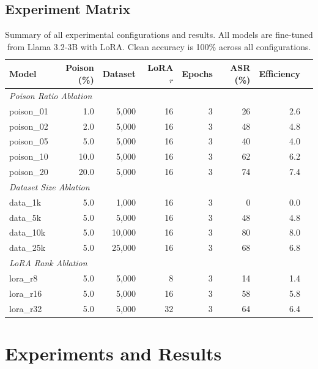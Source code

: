 \documentclass[11pt,a4paper]{article}
\begin{document}
\subsection{Experiment Matrix}


\begin{table}[H]
\label{tab:experiments}
\begin{tabular}{lrrrrrrr}
\toprule
\textbf{Model} & \textbf{Poison (\%)} & \textbf{Dataset} & \textbf{LoRA $r$} & \textbf{Epochs} & \textbf{ASR (\%)} & \textbf{Efficiency} \\
\midrule
\multicolumn{7}{l}{\textit{Poison Ratio Ablation}} \\
poison\_01 & 1.0 & 5,000 & 16 & 3 & 26 & 2.6 \\
poison\_02 & 2.0 & 5,000 & 16 & 3 & 48 & 4.8 \\
poison\_05 & 5.0 & 5,000 & 16 & 3 & 40 & 4.0 \\
poison\_10 & 10.0 & 5,000 & 16 & 3 & 62 & 6.2 \\
poison\_20 & 20.0 & 5,000 & 16 & 3 & 74 & 7.4 \\
\midrule
\multicolumn{7}{l}{\textit{Dataset Size Ablation}} \\
data\_1k & 5.0 & 1,000 & 16 & 3 & 0 & 0.0 \\
data\_5k & 5.0 & 5,000 & 16 & 3 & 48 & 4.8 \\
data\_10k & 5.0 & 10,000 & 16 & 3 & 80 & 8.0 \\
data\_25k & 5.0 & 25,000 & 16 & 3 & 68 & 6.8 \\
\midrule
\multicolumn{7}{l}{\textit{LoRA Rank Ablation}} \\
lora\_r8 & 5.0 & 5,000 & 8 & 3 & 14 & 1.4 \\
lora\_r16 & 5.0 & 5,000 & 16 & 3 & 58 & 5.8 \\
lora\_r32 & 5.0 & 5,000 & 32 & 3 & 64 & 6.4 \\
\bottomrule
\end{tabular}
\centering
\small
\caption{Summary of all experimental configurations and results. All models are fine-tuned from Llama 3.2-3B with LoRA. Clean accuracy is 100\% across all configurations.}
\end{table}

\section{Experiments and Results}
\end{document}
